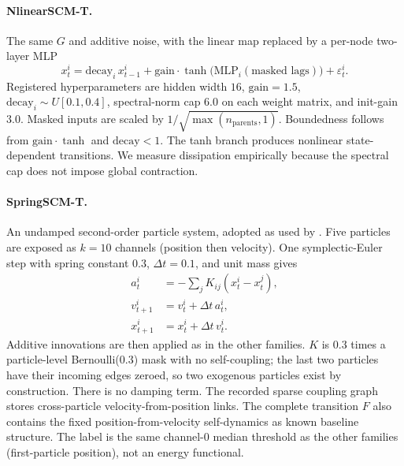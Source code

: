 \documentclass{article}
\begin{document}
\paragraph{NlinearSCM-T.}
The same $G$ and additive noise, with the linear map replaced by a per-node two-layer MLP
\begin{equation}
  x_t^i=\mathrm{decay}_i\,x_{t-1}^i+\mathrm{gain}\cdot\tanh\bigl(\mathrm{MLP}_i(\text{masked lags})\bigr)+\varepsilon_t^i.
\end{equation}
Registered hyperparameters are hidden width $16$, $\mathrm{gain}=1.5$, $\mathrm{decay}_i\sim U[0.1,0.4]$, spectral-norm cap $6.0$ on each weight matrix, and init-gain $3.0$.  Masked inputs are scaled by $1/\sqrt{\max(n_{\mathrm{parents}},1)}$.  Boundedness follows from $\mathrm{gain}\cdot\tanh$ and $\mathrm{decay}<1$. The tanh branch produces nonlinear state-dependent transitions. We measure dissipation empirically because the spectral cap does not impose global contraction.

\paragraph{SpringSCM-T.}
An undamped second-order particle system, adopted as used by \citet{bahri2025causalfeasibility}.  Five particles are exposed as $k=10$ channels (position then velocity).  One symplectic-Euler step with spring constant $0.3$, $\Delta t=0.1$, and unit mass gives
\begin{equation}
  \begin{aligned}
    a_t^i &= -\sum_j K_{ij}(x_t^i-x_t^j),\\
    v_{t+1}^i &= v_t^i+\Delta t\,a_t^i,\\
    x_{t+1}^i &= x_t^i+\Delta t\,v_t^i.
  \end{aligned}
\end{equation}
Additive innovations are then applied as in the other families.  $K$ is $0.3$ times a particle-level Bernoulli($0.3$) mask with no self-coupling; the last two particles have their incoming edges zeroed, so two exogenous particles exist by construction.  There is no damping term.  The recorded sparse coupling graph stores cross-particle velocity-from-position links. The complete transition $F$ also contains the fixed position-from-velocity self-dynamics as known baseline structure.  The label is the same channel-$0$ median threshold as the other families (first-particle position), not an energy functional.
\end{document}
